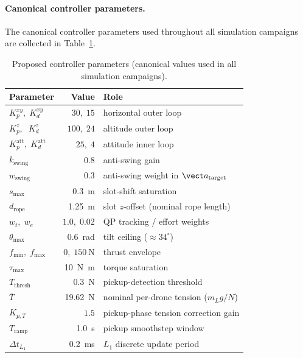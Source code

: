 \paragraph{Canonical controller parameters.} The canonical controller parameters used throughout all simulation campaigns are collected in Table~\ref{tab:baseline-params}.

\begin{table}[t]
  \centering
  \caption{Proposed controller parameters (canonical values used
  in all simulation campaigns).}
  \label{tab:baseline-params}
  \small
  \renewcommand{\arraystretch}{1.05}
  \begin{tabular}{lrl}
    \toprule
    Parameter & Value & Role \\
    \midrule
    $K_p^{xy},\; K_d^{xy}$
      & $30,\;15$
      & horizontal outer loop \\
    $K_p^{z},\;\; K_d^{z}$
      & $100,\;24$
      & altitude outer loop \\
    $K_p^{\mathrm{att}},\; K_d^{\mathrm{att}}$
      & $25,\;4$
      & attitude inner loop \\
    $k_{\mathrm{swing}}$
      & $0.8$
      & anti-swing gain \\
    $w_{\mathrm{swing}}$
      & $0.3$
      & anti-swing weight in $\vect a_{\mathrm{target}}$ \\
    $s_{\max}$
      & \SI{0.3}{\metre}
      & slot-shift saturation \\
    $d_{\mathrm{rope}}$
      & \SI{1.25}{\metre}
      & slot $z$-offset (nominal rope length) \\
    $w_t,\; w_e$
      & $1.0,\;0.02$
      & QP tracking / effort weights \\
    $\theta_{\max}$
      & \SI{0.6}{\radian}
      & tilt ceiling (${\approx}34^{\circ}$) \\
    $f_{\min},\; f_{\max}$
      & $0,\;\SI{150}{\newton}$
      & thrust envelope \\
    $\tau_{\max}$
      & \SI{10}{\newton\metre}
      & torque saturation \\
    $T_{\mathrm{thresh}}$
      & \SI{0.3}{\newton}
      & pickup-detection threshold \\
    $\bar{T}$
      & \SI{19.62}{\newton}
      & nominal per-drone tension ($m_L g / N$) \\
    $K_{p,T}$
      & $1.5$
      & pickup-phase tension correction gain \\
    $T_{\mathrm{ramp}}$
      & \SI{1.0}{\second}
      & pickup smoothstep window \\
    $\Delta t_{L_1}$
      & \SI{0.2}{\milli\second}
      & $L_1$ discrete update period \\
    \bottomrule
  \end{tabular}
\end{table}

